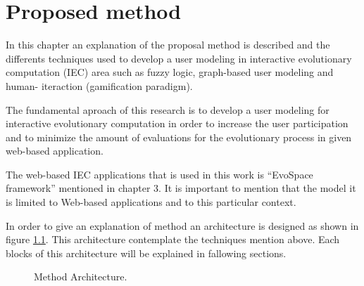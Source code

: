 \chapter{Proposed method}

In this chapter an explanation of the proposal method is described and the
differents techniques used to develop a user modeling in interactive evolutionary
computation (IEC) area such as fuzzy logic, graph-based user modeling and human-
iteraction  (gamification paradigm).

The fundamental aproach of this research is to develop a user modeling for
interactive evolutionary computation in order to increase the user participation
and to minimize the amount of evaluations for the evolutionary process in given
web-based application.

The web-based IEC applications that is used in this work is “EvoSpace framework”
mentioned in chapter 3. It is important to mention that the model it is limited
to Web-based applications and to this particular context.

In order to give an explanation of method an architecture is designed as shown in figure \ref{fig:arch}. This architecture contemplate the techniques mention above. Each blocks of this architecture will be explained in fallowing sections. 

\begin{figure}
	\captionsetup{justification=centering,margin=2cm}
	\centering
	\setlength\fboxsep{0pt}
	\setlength\fboxrule{0.7pt}
	\caption{Method Architecture.}
	\label{fig:arch}       
\end{figure}





